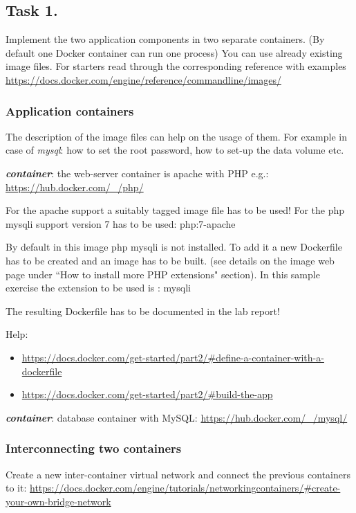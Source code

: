 \documentclass[a4paper]{article}
\begin{document}
\subsection{Task 1.}

Implement the two application components in two separate containers. (By default one Docker container can run one
process)
You can use already existing image files. For starters read through the corresponding reference with examples
\url{https://docs.docker.com/engine/reference/commandline/images/}

\subsubsection{Application containers}
The description of the image files can help on the usage of them. For example in case of \emph{mysql}: how to set the
root password, how to set-up the data volume etc.

\textbf{\emph{ container}}: the web-server container is apache with PHP e.g.: \url{https://hub.docker.com/_/php/}

For the apache support a suitably tagged image file has to be used! For the php mysqli support  version 7 has to
be used: php:7-apache

By default in this image php mysqli is not installed. To add it a new Dockerfile has to be created and an image has to
be built. (see details on the image web page under ``How to install more PHP extensions" section). In this sample
exercise the extension to be used is : mysqli

The resulting Dockerfile has to be documented in the lab report!

Help:
\begin{itemize}
    \item \url{https://docs.docker.com/get-started/part2/#define-a-container-with-a-dockerfile}
    \item \url{https://docs.docker.com/get-started/part2/#build-the-app}
\end{itemize}

\textbf{\emph{ container}}: database container with MySQL: \url{https://hub.docker.com/_/mysql/}

\subsubsection{Interconnecting two containers}
Create a new inter-container virtual network and connect the previous containers to it:
\url{https://docs.docker.com/engine/tutorials/networkingcontainers/#create-your-own-bridge-network}
\end{document}
